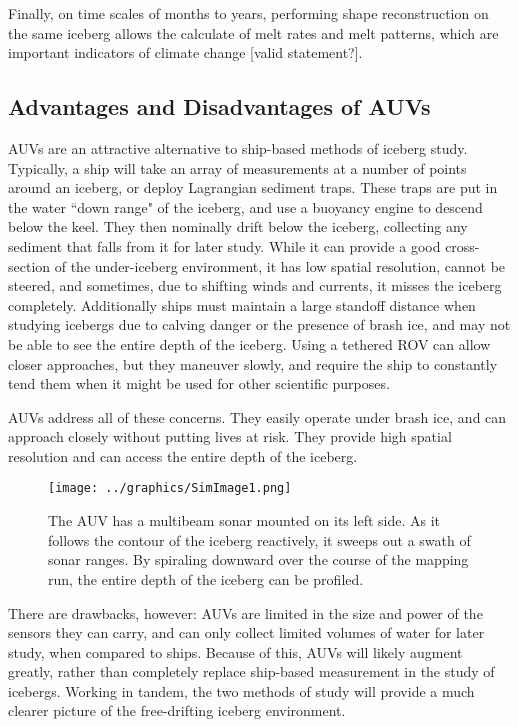 Finally, on time scales of months to years, performing shape reconstruction on the same iceberg allows the calculate of melt rates and melt patterns, which are important indicators of climate change [valid statement?].

\subsection{Advantages and Disadvantages of AUVs}

AUVs are an attractive alternative to ship-based methods of iceberg study. Typically, a ship will take an array of measurements at a number of points around an iceberg, or deploy Lagrangian sediment traps. These traps are put in the water ``down range" of the iceberg, and use a buoyancy engine to descend below the keel. They then nominally drift below the iceberg, collecting any sediment that falls from it for later study. While it can provide a good cross-section of the under-iceberg environment, it has low spatial resolution, cannot be steered, and sometimes, due to shifting winds and currents, it misses the iceberg completely. Additionally ships must maintain a large standoff distance when studying icebergs due to calving danger or the presence of brash ice, and may not be able to see the entire depth of the iceberg. Using a tethered ROV can allow closer approaches, but they maneuver slowly, and require the ship to constantly tend them when it might be used for other scientific purposes.

AUVs address all of these concerns. They easily operate under brash ice, and can approach closely without putting lives at risk. They provide high spatial resolution and can access the entire depth of the iceberg. 


\begin{figure}[htbp]
   \centering
   \texttt{[image: ../graphics/SimImage1.png]} %
   \caption{The AUV has a multibeam sonar mounted on its left side. As it follows the contour of the iceberg reactively, it sweeps out a swath of sonar ranges. By spiraling downward over the course of the mapping run, the entire depth of the iceberg can be profiled.}
   \label{fig:simImage1}
\end{figure}


There are drawbacks, however: AUVs are limited in the size and power of the sensors they can carry, and can only collect limited volumes of water for later study, when compared to ships. Because of this, AUVs will likely augment greatly, rather than completely replace ship-based measurement in the study of icebergs. Working in tandem, the two methods of study will provide a much clearer picture of the free-drifting iceberg environment.

